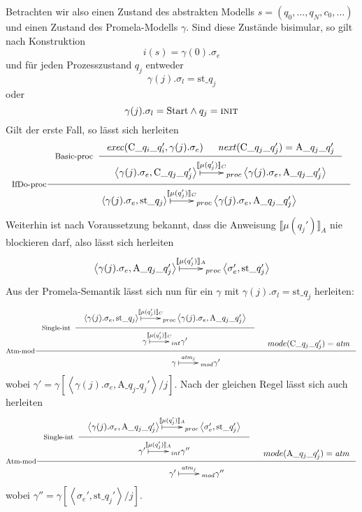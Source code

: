 Betrachten wir also einen Zustand des abstrakten Modells $s=(q_0,\dots,q_N,c_0,\dots)$ und einen Zustand des Promela-Modells $\gamma$.
Sind diese Zustände bisimular, so gilt nach Konstruktion
\[ i(s) = \gamma(0).\sigma_e \]
und für jeden Prozesszustand $q_j$ entweder
\[ \gamma(j).\sigma_l = \textrm{st\_}q_j \]
oder
\[ \gamma(j).\sigma_l = \textrm{Start} \land q_j = \const{init} \]
Gilt der erste Fall, so lässt sich herleiten
\[ \inference[IfDo-proc]{
  \inference[Basic-proc]{\mathit{exec}(\textrm{C\_}q_i\textrm{\_}q_i',\gamma(j).\sigma_e) & \mathit{next}(\textrm{C\_}q_j\textrm{\_}q_j') = \textrm{A\_}q_j\textrm{\_}q_j'}{
  \xymatrix{ \left<\gamma(j).\sigma_e,\textrm{C\_}q_j\textrm{\_}q_j'\right>\ar@{|->}[r]^-{\llbracket \mu(q_j')\rrbracket_C} & _{proc}
    \left<\gamma(j).\sigma_e,\textrm{A\_}q_j\textrm{\_}q_j'\right>}
  }
  }
  { \xymatrix{ \left<\gamma(j).\sigma_e,\textrm{st\_}q_j\right> \ar@{|->}[r]^-{\llbracket \mu(q_j')\rrbracket_C} & _{proc}
      \left<\gamma(j).\sigma_e,\textrm{A\_}q_j\textrm{\_}q_j'\right>}
  }
\]
Weiterhin ist nach Voraussetzung bekannt, dass die Anweisung $\llbracket \mu(q_j')\rrbracket_A$ nie blockieren darf, also lässt sich herleiten
\[
  \xymatrix{ \left<\gamma(j).\sigma_e,\textrm{A\_}q_j\textrm{\_}q_j'\right> \ar@{|->}[r]^-{\llbracket \mu(q_j')\rrbracket_A} & _{proc}
    \left<\sigma_e',\textrm{st\_}q_j'\right> }
\]
Aus der Promela-Semantik lässt sich nun für ein $\gamma$ mit $\gamma(j).\sigma_l = \textrm{st\_}q_j$ herleiten:
\[
\inference[Atm-mod]{
  \inference[Single-int]{
    \xymatrix{ \left<\gamma(j).\sigma_e,\textrm{st\_}q_j\right> \ar@{|->}[r]^-{\llbracket \mu(q_j')\rrbracket_C} & _{proc}
      \left<\gamma(j).\sigma_e,\textrm{A\_}q_j\textrm{\_}q_j'\right> }
  }{
    \xymatrix{ \gamma \ar@{|->}[r]^-{\llbracket \mu(q_j')\rrbracket_C} & _{int}
      \gamma'
    }
  } & mode(\textrm{C\_}q_j\textrm{\_}q_j') = \mathit{atm}
}{
  \xymatrix{ \gamma \ar@{|->}[r]^-{\mathit{atm}_j} & _{mod}
    \gamma'
  }
}
\]
wobei $\gamma' = \gamma[\left<\gamma(j).\sigma_e,\textrm{A\_}q_j\textrm{\_}q_j'\right>/j]$.
Nach der gleichen Regel lässt sich auch herleiten
\[
\inference[Atm-mod]{
  \inference[Single-int]{
    \xymatrix{ \left<\gamma(j).\sigma_e,\textrm{A\_}q_j\textrm{\_}q_j'\right> \ar@{|->}[r]^-{\llbracket \mu(q_j')\rrbracket_A} & _{proc}
      \left<\sigma_e',\textrm{st\_}q_j'\right> }
  }{
    \xymatrix{ \gamma'\ar@{|->}[r]^-{\llbracket \mu(q_j')\rrbracket_A} & _{int}
      \gamma''
    }
  } & mode(\textrm{A\_}q_j\textrm{\_}q_j') = \mathit{atm}
}{
  \xymatrix{ \gamma'\ar@{|->}[r]^-{\mathit{atm}_j} & _{mod}
    \gamma''
  }
}
\]
wobei $\gamma'' = \gamma[\left<\sigma_e',\textrm{st\_}q_j'\right>/j]$.
